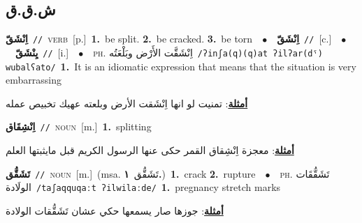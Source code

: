 \documentclass[10pt,a4paper,twoside]{article} %
\begin{document}
\begin{multicols}{2}
\vspace{-3mm}
\subsection*{\color{blue}\foreignlanguage{arabic}{ش.ق.ق}\color{blue}{}} 

{\setlength\topsep{0pt}\textbf{\foreignlanguage{arabic}{اِنْشَقّ}}\ {\color{gray}\texttt{//}\color{black}}\ \textsc{verb}\ [p.]\ \textbf{1.}~be split.  \textbf{2.}~be cracked.  \textbf{3.}~be torn\ \ $\bullet$\ \ \setlength\topsep{0pt}\textbf{\foreignlanguage{arabic}{اِنْشَقّ}}\ {\color{gray}\texttt{//}\color{black}}\ [c.]\ \ $\bullet$\ \ \setlength\topsep{0pt}\textbf{\foreignlanguage{arabic}{يِنْشَقّ}}\ {\color{gray}\texttt{//}\color{black}}\ [i.]\ \ $\bullet$\ \ \textsc{ph.} \color{gray} \foreignlanguage{arabic}{اِنْشَقَّت الأَرْض وبَلْعَتُه}\color{black}\ {\color{gray}\texttt{/{\sffamily ʔinʃa(q)(q)at ʔilʔar(dˤ) wubalʕato}/}\color{black}}\ \textbf{1.}~It is an idiomatic expression that means that the situation is very embarrassing\  \begin{flushright}\color{gray}\foreignlanguage{arabic}{\textbf{\underline{\foreignlanguage{arabic}{أمثلة}}}: تمنيت لو انها اِنْشَقت الأرض وبلعته عهيك تخبيص عمله}\end{flushright}\color{black}} \vspace{2mm}

{\setlength\topsep{0pt}\textbf{\foreignlanguage{arabic}{اِنْشِقَاق}}\ {\color{gray}\texttt{//}\color{black}}\ \textsc{noun}\ [m.]\ \textbf{1.}~splitting\  \begin{flushright}\color{gray}\foreignlanguage{arabic}{\textbf{\underline{\foreignlanguage{arabic}{أمثلة}}}: معجزة اِنْشِقاق القمر حكى عنها الرسول الكريم قبل مايثبتها العلم}\end{flushright}\color{black}} \vspace{2mm}

{\setlength\topsep{0pt}\textbf{\foreignlanguage{arabic}{تَشَقُّق}}\ {\color{gray}\texttt{//}\color{black}}\ \textsc{noun}\ [m.]\ \color{gray}(msa. \foreignlanguage{arabic}{تَشَقُّق}~\foreignlanguage{arabic}{\textbf{١.}})\color{black}\ \textbf{1.}~crack  \textbf{2.}~rupture\ \ $\bullet$\ \ \textsc{ph.} \color{gray} \foreignlanguage{arabic}{تَشَقُّقَات الولَادة}\color{black}\ {\color{gray}\texttt{/{\sffamily taʃaqquqaːt ʔilwilaːde}/}\color{black}}\ \textbf{1.}~pregnancy stretch marks\  \begin{flushright}\color{gray}\foreignlanguage{arabic}{\textbf{\underline{\foreignlanguage{arabic}{أمثلة}}}: جوزها صار يسمعها حكي عشان تَشَقُّقات الولادة}\end{flushright}\color{black}} \vspace{2mm}


\end{multicols}
\end{document}
